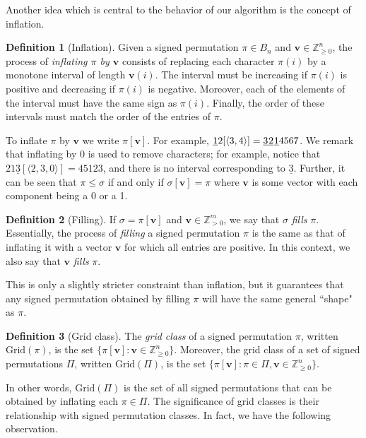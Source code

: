 \documentclass{article}
\numberwithin{equation}{section}
\theoremstyle{definition}
\newtheorem{defn}{Definition}[section]
\newcommand{\V}{\textbf{v}}
\newcommand{\Grid}{\text{Grid}}
\begin{document}
Another idea which is central to the behavior of our algorithm is the concept of inflation.

\begin{defn}[Inflation]
    Given a signed permutation $\pi\in B_n$ and $\V\in\mathbb{Z}_{\geq0}^n$, the process of \emph{inflating $\pi$ by $\V$} consists of replacing each character $\pi(i)$ by a monotone interval of length $\V(i)$. The interval must be increasing if $\pi(i)$ is positive and decreasing if $\pi(i)$ is negative. Moreover, each of the elements of the interval must have the same sign as $\pi(i)$. Finally, the order of these intervals must match the order of the entries of $\pi$.
\end{defn}
To inflate $\pi$ by $\V$ we write $\pi[\V]$.  For example, $\underline{1}2 [\langle 3,4\rangle] = \underline{3}\hspace{0.02cm}\underline{2}\hspace{0.02cm}\underline{1}4567$. We remark that inflating by 0 is used to remove characters; for example, notice that $21\underline{3}[\langle2,3,0\rangle]=45123$, and there is no interval corresponding to $\underline{3}$.  Further, it can be seen that $\pi \leq \sigma$ if and only if $\sigma[\V] = \pi$ where $\V$ is some vector with each component being a 0 or a 1.

\begin{defn}[Filling]
  If $\sigma=\pi[\V]$ and $\V\in\mathbb{Z}_{>0}^m$, we say that $\sigma$ \emph{fills} $\pi$. Essentially, the process of \emph{filling} a signed permutation $\pi$ is the same as that of inflating it with a vector $\V$ for which all entries are positive. In this context, we also say that $\V$ \emph{fills} $\pi$.
\end{defn} This is only a slightly stricter constraint than inflation, but it guarantees that any signed permutation obtained by filling $\pi$ will have the same general ``shape" as $\pi$.


\begin{defn}[Grid class]
  The \emph{grid class} of a signed permutation $\pi$, written $\Grid(\pi)$, is the set $\{\pi[\V] : \V\in\mathbb{Z}^n_{\geq0}\}$. Moreover, the grid class of a set of signed permutations $\Pi$, written $\Grid(\Pi)$, is the set $\{\pi[\V] : \pi\in\Pi, \V\in\mathbb{Z}^n_{\geq0}\}$.
\end{defn}

In other words, $\Grid(\Pi)$ is the set of all signed permutations that can be obtained by inflating each $\pi\in\Pi$. 
 The significance of grid classes is their relationship with signed permutation classes.  In fact, we have the following observation.
 
\end{document}

